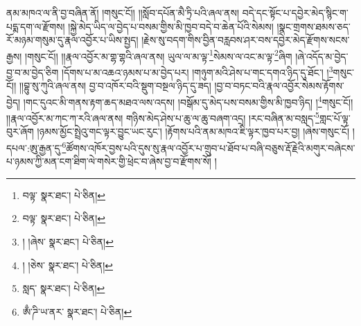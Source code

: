 ནམ་མཁའ་ལ་ནི་བྱ་བཞིན་ནོ། །གསུང་ངོ།། །།སློབ་དཔོན་མཻ་ཏྲི་པའི་ཞལ་ནས། བདེ་དང་སྟོང་པ་དབྱེར་མེད་སྙིང་ག་པདྨ་དག་ལ་རྫོགས། །སྐྱེ་མེད་ཡིད་ལ་བྱེད་པ་བསམ་གྱིས་མི་ཁྱབ་བདེ་བ་ཆེན་པོའི་སེམས། །སྣང་གྲགས་ཐམས་ཅད་རོ་མཉམ་གསུམ་དུ་རྣལ་འབྱོར་པ་ཡིས་སྤྱད། །རྗེས་སུ་བདག་གིས་བྱིན་བརླབས་ཤར་བས་དབྱེར་མེད་རྫོགས་སངས་རྒྱས། །གསུང་ངོ།། །།རྣལ་འབྱོར་མ་གྷ་གྷའི་ཞལ་ནས། ཡུལ་ལ་མ་ལྟ་\footnote{བལྟ་  སྣར་ཐང་།  པེ་ཅིན། }སེམས་ལ་འང་མ་ལྟ་\footnote{བལྟ་  སྣར་ཐང་།  པེ་ཅིན། }ཞིག །ཞེ་འདོད་མ་བྱེད་བྱ་བ་མ་བྱེད་ཅིག །དོགས་པ་མ་འཆའ་ཉམས་པ་མ་བྱེད་པར། །གཉུག་མའི་ཤེས་པ་གང་དགའ་ཉིད་དུ་ཐོང་། །\footnote{། །ཞེས་  སྣར་ཐང་།  པེ་ཅིན། }གསུང་ངོ།། །།བྷུ་སུ་ཀུའི་ཞལ་ནས། བྱ་བ་འཁོར་བའི་སྡུག་བསྔལ་ཉིད་དུ་ཟད། །བྱ་བ་བཏང་བའི་རྣལ་འབྱོར་སེམས་རྟོགས་བྱེད། །གང་དུའང་མི་གནས་རྟག་ཆད་མཐའ་ལས་འདས། །བསྒོམ་དུ་མེད་པས་བསམ་གྱིས་མི་ཁྱབ་ཉིད། །\footnote{། །ཅེས་  སྣར་ཐང་།  པེ་ཅིན། }གསུང་ངོ།། །།རྣལ་འབྱོར་མ་ཀང་ཀ་རའི་ཞལ་ནས། གཉིས་མེད་ཤེས་པ་ཆུ་ལ་ཆུ་བཞག་འདྲ། །རང་བཞིན་མ་བསླད་\footnote{སླད་  སྣར་ཐང་།  པེ་ཅིན། }གླང་པོ་ལྟ་བུར་ཞོག །ཉམས་མྱོང་སྤྲེའུ་གང་ལྟར་བྱུང་ཡང་རུང་། །རྟོགས་པའི་ནམ་མཁའ་ཇི་ལྟར་ཁྱབ་པར་བྱ། །ཞེས་གསུང་ངོ། །དཔལ་:ཨུ་རྒྱན་དུ་\footnote{ཨྃ་ཌི་ཡ་ནར་  སྣར་ཐང་།  པེ་ཅིན། }ཚོགས་འཁོར་བྱས་པའི་དུས་སུ་རྣལ་འབྱོར་པ་གྲུབ་པ་ཐོབ་པ་བཞི་བཅུས་རྡོ་རྗེའི་མགུར་བཞེངས་པ་ཉམས་ཀྱི་མན་ངག་ཐིག་ལེ་གསེར་གྱི་ཕྲེང་བ་ཞེས་བྱ་བ་རྫོགས་སོ། ། 